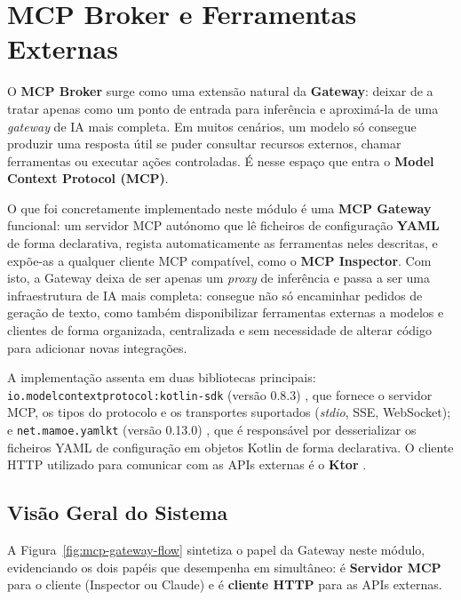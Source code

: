 \chapter{MCP Broker e Ferramentas Externas}

O \textbf{MCP Broker} surge como uma extensão natural da \textbf{Gateway}: deixar de a tratar apenas como um ponto de entrada para inferência e aproximá-la de uma \textit{gateway} de IA mais completa. Em muitos cenários, um modelo só consegue produzir uma resposta útil se puder consultar recursos externos, chamar ferramentas ou executar ações controladas. É nesse espaço que entra o \textbf{Model Context Protocol (MCP)}.

O que foi concretamente implementado neste módulo é uma \textbf{MCP Gateway} funcional: um servidor MCP autónomo que lê ficheiros de configuração \textbf{YAML} de forma declarativa, regista automaticamente as ferramentas neles descritas, e expõe-as a qualquer cliente MCP compatível, como o \textbf{MCP Inspector}. Com isto, a Gateway deixa de ser apenas um \textit{proxy} de inferência e passa a ser uma infraestrutura de IA mais completa: consegue não só encaminhar pedidos de geração de texto, como também disponibilizar ferramentas externas a modelos e clientes de forma organizada, centralizada e sem necessidade de alterar código para adicionar novas integrações.

A implementação assenta em duas bibliotecas principais: \texttt{io.modelcontextprotocol:kotlin-sdk} (versão 0.8.3) \cite{mcp_kotlin_sdk}, que fornece o servidor MCP, os tipos do protocolo e os transportes suportados (\textit{stdio}, SSE, WebSocket); e \texttt{net.mamoe.yamlkt} (versão 0.13.0) \cite{yamlkt_ref}, que é responsável por desserializar os ficheiros YAML de configuração em objetos Kotlin de forma declarativa. O cliente HTTP utilizado para comunicar com as APIs externas é o \textbf{Ktor} \cite{ktor_ref}.


\section{Visão Geral do Sistema}

A Figura~\ref{fig:mcp-gateway-flow} sintetiza o papel da Gateway neste módulo, evidenciando os dois papéis que desempenha em simultâneo: é \textbf{Servidor MCP} para o cliente (Inspector ou Claude) e é \textbf{cliente HTTP} para as APIs externas.

